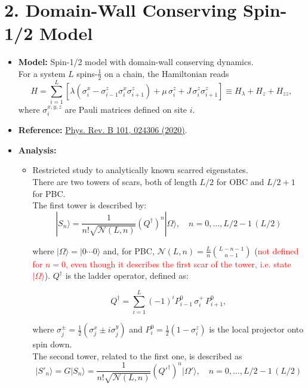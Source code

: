 \documentclass[11pt]{article}
\begin{document}
\section*{2. Domain-Wall Conserving Spin-1/2 Model}
\begin{itemize}
    \item \textbf{Model:} Spin-1/2 model with domain-wall conserving dynamics.\\
    
     For a system $L$ spins-$\tfrac{1}{2}$ on a chain, the Hamiltonian reads
	\begin{equation}
	H = \sum_{i=1}^{L} \left[ \lambda \left( \sigma^x_i - \sigma^z_{i-1} \sigma^x_i \sigma^z_{i+1} \right) + \mu\, \sigma^z_i + J\, \sigma^z_i \sigma^z_{i+1} \right]
	\equiv H_\lambda + H_z + H_{zz},
	\label{eq:H}
	\end{equation}
    where $\sigma^{x,y,z}_i$ are Pauli matrices defined on site $i$.

	

    \item \textbf{Reference:} \href{https://journals.aps.org/prb/abstract/10.1103/PhysRevB.101.024306}{Phys. Rev. B 101, 024306 (2020)}.
    \item \textbf{Analysis:}
    \begin{itemize}
        \item Restricted study to analytically known scarred eigenstates.\\ There are two towers of scars, both of length $L/2$ for OBC and $L/2 + 1$ for PBC.\\
         The first tower is described by:
	 \begin{equation}
	|S_n\rangle = \frac{1}{n! \sqrt{\mathcal{N}(L, n)}} \left(Q^\dagger\right)^n |\Omega\rangle, \quad n = 0,\hdots,L/2 - 1 \, (L/2)
	\end{equation}
	
	where $|\Omega\rangle = |0 \cdots 0\rangle$ and, for PBC, $\mathcal{N}(L, n) = \frac{L}{n} \binom{L - n - 1}{n - 1}$ (\textcolor{red}{not defined for $n=0$, even though it describes the first scar of the tower, i.e. state $|\Omega\rangle $}). $Q^\dagger$ is 	the ladder operator, defined as:
	
	\begin{equation}
	Q^\dagger = \sum_{i = 1}^{L} (-1)^i P^0_{i-1} \, \sigma^+_i \, P^0_{i+1}, 
	\end{equation}
	
	where $\sigma_j^\pm = \frac{1}{2} (\sigma_j^x \pm i \sigma_j^y)$ and $P^0_i = \frac{1}{2} (1 - \sigma^z_i)$ is the local projector onto spin down.\\
        The second tower, related to the first one, is described as 
        \begin{equation}
	|S'_n\rangle = G |S_n\rangle = \frac{1}{n! \sqrt{\mathcal{N}(L, n)}} \left(Q'^\dagger\right)^n |\Omega'\rangle, \quad n = 0,\hdots,L/2 - 1 \, (L/2)
	\end{equation}
	

\end{itemize}
\end{itemize}
\end{document}
